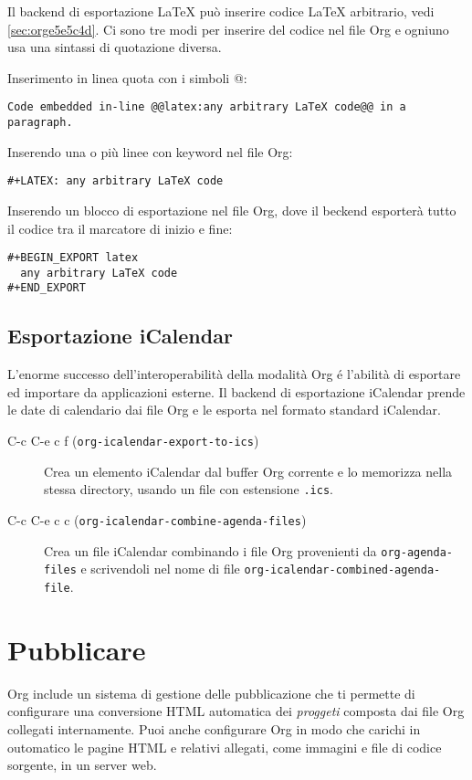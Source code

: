 \documentclass[11pt]{article}
\begin{document}
Il backend di esportazione \LaTeX{} può inserire codice \LaTeX{} arbitrario,
vedi \ref{sec:orge5e5c4d}. Ci sono tre modi per inserire del codice nel
file Org e ogniuno usa una sintassi di quotazione diversa.

Inserimento in linea quota con i simboli @:

\begin{verbatim}
Code embedded in-line @@latex:any arbitrary LaTeX code@@ in a paragraph.
\end{verbatim}


Inserendo una o più linee con keyword nel file Org:

\begin{verbatim}
#+LATEX: any arbitrary LaTeX code
\end{verbatim}


Inserendo un blocco di esportazione nel file Org, dove il beckend
esporterà tutto il codice tra il marcatore di inizio e fine:

\begin{verbatim}
#+BEGIN_EXPORT latex
  any arbitrary LaTeX code
#+END_EXPORT
\end{verbatim}

\subsection{Esportazione iCalendar}
\label{sec:org38863d6}
L'enorme successo dell'interoperabilità della modalità Org é l'abilità
di esportare ed importare da applicazioni esterne. Il backend di
esportazione iCalendar prende le date di calendario dai file Org e le
esporta nel formato standard iCalendar.

\begin{description}
\item[{C-c C-e c f (\texttt{org-icalendar-export-to-ics})}] Crea un elemento iCalendar dal buffer Org corrente e lo memorizza
nella stessa directory, usando un file con estensione \texttt{.ics}.

\item[{C-c C-e c c (\texttt{org-icalendar-combine-agenda-files}) }] Crea un file iCalendar combinando i file Org provenienti da
\texttt{org-agenda-files} e scrivendoli nel nome di file
\texttt{org-icalendar-combined-agenda-file}.
\end{description}

\section{Pubblicare}
\label{sec:org3d565e7}
Org include un sistema di gestione delle pubblicazione che ti permette
di configurare una conversione HTML automatica dei \emph{proggeti} composta
dai file Org collegati internamente. Puoi anche configurare Org in
modo che carichi in outomatico le pagine HTML e relativi allegati,
come immagini e file di codice sorgente, in un server web.
\end{document}
